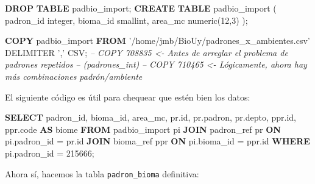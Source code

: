 \documentclass[spanish,]{article}
\newenvironment{Shaded}{}{}
\newcommand{\KeywordTok}[1]{\textcolor[rgb]{0.00,0.44,0.13}{\textbf{{#1}}}}
\newcommand{\DataTypeTok}[1]{\textcolor[rgb]{0.56,0.13,0.00}{{#1}}}
\newcommand{\DecValTok}[1]{\textcolor[rgb]{0.25,0.63,0.44}{{#1}}}
\newcommand{\StringTok}[1]{\textcolor[rgb]{0.25,0.44,0.63}{{#1}}}
\newcommand{\CommentTok}[1]{\textcolor[rgb]{0.38,0.63,0.69}{\textit{{#1}}}}
\newcommand{\NormalTok}[1]{{#1}}
\begin{document}
\begin{Shaded}
\begin{Highlighting}[]
\KeywordTok{DROP} \KeywordTok{TABLE} \NormalTok{padbio_import;}
\KeywordTok{CREATE} \KeywordTok{TABLE} \NormalTok{padbio_import (}
  \NormalTok{padron_id }\DataTypeTok{integer}\NormalTok{,}
  \NormalTok{bioma_id }\DataTypeTok{smallint}\NormalTok{,}
  \NormalTok{area_mc }\DataTypeTok{numeric}\NormalTok{(}\DecValTok{12}\NormalTok{,}\DecValTok{3}\NormalTok{)}
\NormalTok{);}
    
\KeywordTok{COPY} \NormalTok{padbio_import }\KeywordTok{FROM} \StringTok{'/home/jmb/BioUy/padrones_x_ambientes.csv'} \NormalTok{DELIMITER }\StringTok{','} \NormalTok{CSV;}
\CommentTok{-- COPY 708835 <- Antes de arreglar el problema de padrones repetidos}
\CommentTok{--                (padrones_int)}
\CommentTok{-- COPY 710465 <- Lógicamente, ahora hay más combinaciones padrón/ambiente}
\end{Highlighting}
\end{Shaded}

El siguiente código es útil para chequear que estén bien los datos:

\begin{Shaded}
\begin{Highlighting}[]
\KeywordTok{SELECT}
 \NormalTok{padron_id, bioma_id, area_mc, pr.id, }
 \NormalTok{pr.padron, pr.depto, ppr.id, ppr.code }\KeywordTok{AS} \NormalTok{biome}
  \KeywordTok{FROM} \NormalTok{padbio_import pi }
  \KeywordTok{JOIN} \NormalTok{padron_ref pr }\KeywordTok{ON} \NormalTok{pi.padron_id = pr.id }
  \KeywordTok{JOIN} \NormalTok{bioma_ref ppr }\KeywordTok{ON} \NormalTok{pi.bioma_id = ppr.id }
 \KeywordTok{WHERE} \NormalTok{pi.padron_id = }\DecValTok{215666}\NormalTok{;}
\end{Highlighting}
\end{Shaded}

Ahora sí, hacemos la tabla \texttt{padron\_bioma} definitiva:
\end{document}

